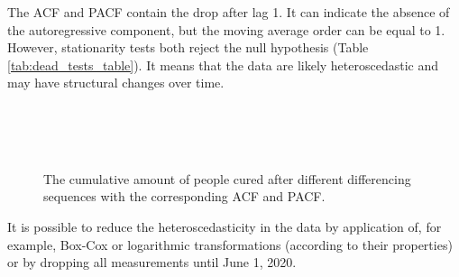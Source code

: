 The ACF and PACF contain the drop after lag 1. It can indicate the absence of the autoregressive component, but the moving average order can be equal to 1. However, stationarity tests both reject the null hypothesis (Table \ref{tab:dead_tests_table}). It means that the data are likely heteroscedastic and may have structural changes over time.

\begin{figure}[!htb]
  \centering
   \\
   \\
   \\
  \caption{The cumulative amount of people cured after different differencing sequences with the corresponding ACF and PACF.}
  \label{fig:dead_diff_ex}
\end{figure}
It is possible to reduce the heteroscedasticity in the data by application of, for example, Box-Cox or logarithmic transformations (according to their properties) or by dropping all measurements until June 1, 2020.

